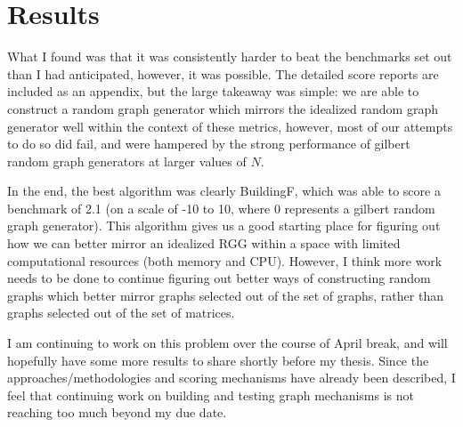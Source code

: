 \section{Results}

What I found was that it was consistently harder to beat the benchmarks set out than I had anticipated, however, it was possible.
The detailed score reports are included as an appendix, but the large takeaway was simple:
we are able to construct a random graph generator which mirrors the idealized random graph generator well within the context of these metrics, however, most of our attempts to do so did fail, and were hampered by the strong performance of gilbert random graph generators at larger values of $N$.

In the end, the best algorithm was clearly BuildingF, which was able to score a benchmark of 2.1 (on a scale of -10 to 10, where 0 represents a gilbert random graph generator). 
This algorithm gives us a good starting place for figuring out how we can better mirror an idealized RGG within a space with limited computational resources (both memory and CPU).
However, I think more work needs to be done to continue figuring out better ways of constructing random graphs which better mirror graphs selected out of the set of graphs, rather than graphs selected out of the set of matrices.

I am continuing to work on this problem over the course of April break, and will hopefully have some more results to share shortly before my thesis.
Since the approaches/methodologies and scoring mechanisms have already been described, I feel that continuing work on building and testing graph mechanisms is not reaching too much beyond my due date.
